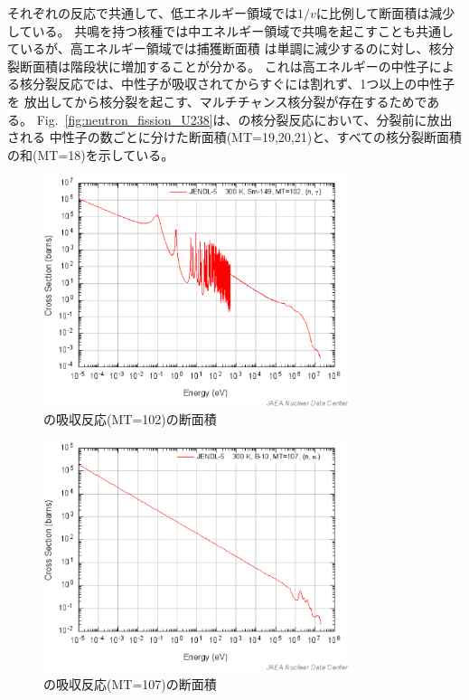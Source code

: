 それぞれの反応で共通して、低エネルギー領域では$1/v$に比例して断面積は減少している。
共鳴を持つ核種では中エネルギー領域で共鳴を起こすことも共通しているが、高エネルギー領域では捕獲断面積
は単調に減少するのに対し、核分裂断面積は階段状に増加することが分かる。
これは高エネルギーの中性子による核分裂反応では、中性子が吸収されてからすぐには割れず、1つ以上の中性子を
放出してから核分裂を起こす、マルチチャンス核分裂が存在するためである。
Fig.~\ref{fig:neutron_fission_U238}は、の核分裂反応において、分裂前に放出される
中性子の数ごとに分けた断面積(MT=19,20,21)と、すべての核分裂断面積の和(MT=18)を示している。

\begin{figure}[htbp]
  \centering
  \includegraphics[width=0.8\textwidth]{figure/SmMT102.eps}
  \caption{の吸収反応(MT=102)の断面積}
  \label{fig:neutron_absorption_Sm149}
\end{figure}

\begin{figure}[htbp]
  \centering
  \includegraphics[width=0.8\textwidth]{figure/B10MT107.eps}
  \caption{の吸収反応(MT=107)の断面積}
  \label{fig:neutron_capture_B10}
\end{figure}


